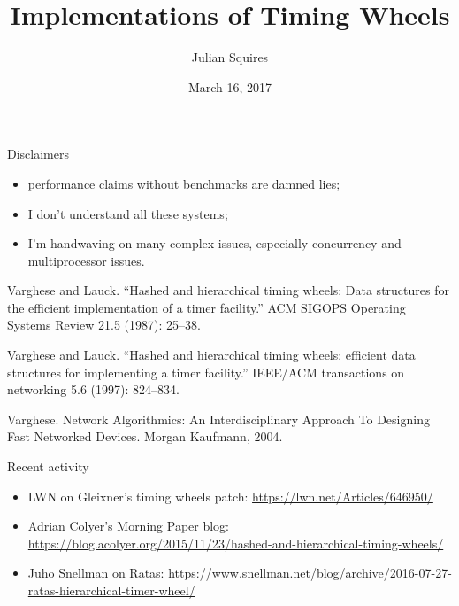 \documentclass{beamer}
\title{Implementations of Timing Wheels}
\author{Julian Squires}
\institute{AdGear Technologies, Inc.}
\date{March 16, 2017}
\begin{document}
\begin{frame}
  \titlepage{}
\end{frame}

\begin{frame}{Disclaimers}
  \begin{itemize}
  \item performance claims without benchmarks are damned lies;
  \item I don't understand all these systems;
  \item I'm handwaving on many complex issues, especially concurrency
    and multiprocessor issues.
  \end{itemize}
\end{frame}

\begin{frame}
  Varghese and Lauck. ``Hashed and hierarchical timing
wheels: Data structures for the efficient implementation of a timer
facility.'' ACM SIGOPS Operating Systems Review 21.5 (1987): 25--38.

\vspace{1.5em}

Varghese and Lauck. ``Hashed and hierarchical timing wheels: efficient
data structures for implementing a timer facility.''  IEEE/ACM
transactions on networking 5.6 (1997): 824--834.

\vspace{1.5em}

Varghese. Network Algorithmics: An Interdisciplinary Approach
To Designing Fast Networked Devices. Morgan Kaufmann, 2004.
\end{frame}

\begin{frame}{Recent activity}
  \begin{itemize}
  \item LWN on Gleixner's timing wheels patch:
    \hyperlink{https://lwn.net/Articles/646950/}{https://lwn.net/Articles/646950/}

  \item Adrian Colyer's Morning Paper blog:
    \hyperlink{https://blog.acolyer.org/2015/11/23/hashed-and-hierarchical-timing-wheels/}{https://blog.acolyer.org/2015/11/23/hashed-and-hierarchical-timing-wheels/}

  \item Juho Snellman on Ratas:
    \hyperlink{https://www.snellman.net/blog/archive/2016-07-27-ratas-hierarchical-timer-wheel/}{https://www.snellman.net/blog/archive/2016-07-27-ratas-hierarchical-timer-wheel/}
  \end{itemize}
\end{frame}
\end{document}
